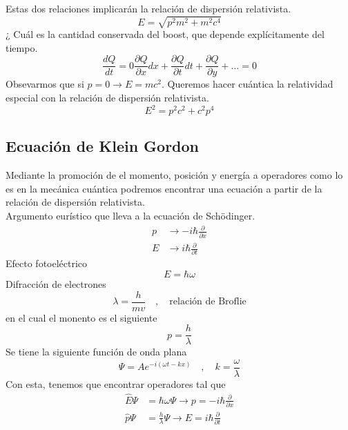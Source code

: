 \documentclass[../main.tex]{subfiles}
\begin{document}
Estas dos relaciones implicarán la relación de dispersión relativista. 
\begin{equation}
  E= \sqrt{p^2m^2 + m^2c^4}
\end{equation}
¿ Cuál es la cantidad conservada del boost, que depende explícitamente del tiempo. 
\begin{equation}
  \frac{dQ}{dt}=0 \frac{\partial Q}{\partial x}dx + \frac{\partial Q}{\partial t}dt + \frac{\partial Q}{\partial y} + \dots = 0
\end{equation}
Obsevarmos que si $p=0 \rightarrow E=mc^2$. Queremos hacer cuántica la relatividad especial con la relación de dispersión relativista.
\begin{equation}
  E^2=p^2c^2 + c^2p^4
\end{equation}
\subsection{Ecuación de Klein Gordon}
Mediante la promoción de el momento, posición y energía a operadores como lo es en la mecánica cuántica podremos encontrar una ecuación a partir de la relación de dispersión relativista. \\
Argumento eurístico que lleva a la ecuación de Schödinger.
\begin{align*}
  p & \rightarrow -i\hbar \frac{\partial}{\partial x} \\
  E & \rightarrow i\hbar\frac{\partial}{\partial t}
\end{align*}
Efecto fotoeléctrico
\begin{equation}
  E=\hbar\omega 
\end{equation}
Difracción de electrones
\begin{equation}
  \lambda = \frac{h}{mv} \quad , \quad \text{relación de Broflie}
\end{equation}
en el cual el monento es el siguiente
\begin{equation}
  p= \frac{h}{\lambda}
\end{equation}
Se tiene la siguiente función de onda plana
\begin{equation}
  \Psi=Ae^{-i(\omega t- kx)} \quad , \quad k=\frac{\omega}{\lambda}
\end{equation}
Con esta, tenemos que encontrar operadores tal que
\begin{align*}
  \hat{E}\Psi  & = \hbar \omega \Psi  \rightarrow   p  = -i\hbar \frac{\partial}{\partial x}\\
  \hat{p}\Psi  & = \frac{h}{\lambda}\Psi \rightarrow  E  = i\hbar \frac{\partial}{\partial t} 
\end{align*}
\end{document}
